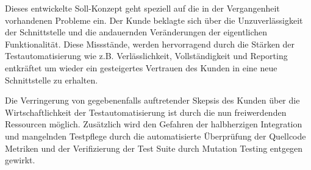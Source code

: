 Dieses entwickelte Soll-Konzept geht speziell auf die in der Vergangenheit vorhandenen Probleme ein. Der Kunde beklagte sich über die Unzuverlässigkeit der Schnittstelle und die andauernden Veränderungen der eigentlichen Funktionalität. Diese Missstände, werden hervorragend durch die Stärken der Testautomatisierung wie z.B. Verlässlichkeit, Vollständigkeit und Reporting entkräftet um wieder ein gesteigertes Vertrauen des Kunden in eine neue Schnittstelle zu erhalten. 

Die Verringerung von gegebenenfalls auftretender Skepsis des Kunden über die Wirtschaftlichkeit der Testautomatisierung ist durch die nun freiwerdenden Ressourcen möglich. Zusätzlich wird den Gefahren der halbherzigen Integration und mangelnden Testpflege durch die automatisierte Überprüfung der Quellcode Metriken und der Verifizierung der Test Suite durch Mutation Testing entgegen gewirkt.
